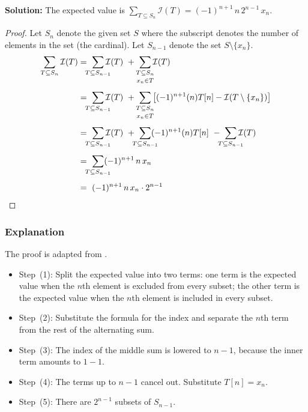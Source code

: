 
\textbf{Solution:}
The expected value is $\sum_{T \subseteq S_{n}} \mathcal{I} (T) = (-1)^{n+1}\,n\,2^{n-1}\,x_{n}$.

\begin{proof}
Let $S_{n}$ denote the given set $S$ where the subscript denotes the number of elements in the set (the cardinal). Let $S_{n-1}$ denote the set $S\setminus\{x_{n}\}$.
\begin{align}
\sum_{T \subseteq S_{n}} \mathcal{I} (T)
& = \ \sum_{\mathclap{\substack{T \subseteq S_{n-1}}}} \mathcal{I} (T)
\ +\ \sum_{\mathclap{\substack{T \subseteq S_{n} \\[0.5ex] x_{n} \in T}}} \mathcal{I} (T)
\\[1ex]
& = \ \sum_{\mathclap{\substack{T \subseteq S_{n-1}}}} \mathcal{I} (T)
\ +\ \sum_{\mathclap{\substack{T \subseteq S_{n} \\[0.5ex] x_{n} \in T}}} \left[(-1)^{n+1}(n)T[n]-\mathcal{I} (T\setminus\{x_{n}\})\right]
\\[1ex]
& = \ \sum_{\mathclap{\substack{T \subseteq S_{n-1}}}} \mathcal{I} (T)
\ +\ \sum_{\mathclap{\substack{T \subseteq S_{n-1}}}} (-1)^{n+1}(n)T[n]
\ -\ \sum_{\mathclap{\substack{T \subseteq S_{n-1}}}} \mathcal{I} (T)
\\[1ex]
& = \ \sum_{\mathclap{\substack{T \subseteq S_{n-1}}}} (-1)^{n+1} \, n \, x_{n}
\\[1ex]
& = \ (-1)^{n+1} \, n \, x_{n} \cdot 2^{n-1}
\end{align}
\end{proof}

\subsubsection*{Explanation}
The proof is adapted from \cite{aops:1983}. 
\begin{itemize}
\item Step~(1): Split the expected value into two terms: one term is the expected value when the $n$th element is excluded from every subset; the other term is the expected value when the $n$th element is included in every subset.
\item Step~(2): Substitute the formula for the index and separate the $n$th term from the rest of the alternating sum.
\item Step~(3): The index of the middle sum is lowered to $n-1$, because the inner term amounts to $1-1$. 
\item Step~(4): The terms up to $n-1$ cancel out. Substitute $T[n]=x_{n}$.
\item Step~(5): There are $2^{n-1}$ subsets of $S_{n-1}$.
\end{itemize}
